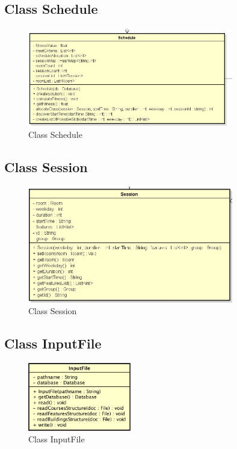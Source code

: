 \documentclass[a4paper]{article}
\begin{document}
\subsection{Class Schedule}
\begin{figure}[H]
\centering
\includegraphics[width=0.8\textwidth]{Schedule.jpg}
\caption{\label{fig:schedule}Class Schedule}
\end{figure}


\subsection{Class Session}
\begin{figure}[H]
\centering
\includegraphics[width=0.8\textwidth]{session.jpg}
\caption{\label{fig:session}Class Session}
\end{figure}


\subsection{Class InputFile}
\begin{figure}[H]
\centering
\includegraphics[width=0.4\textwidth]{InputFile.png}
\caption{\label{fig:InputFile}Class InputFile}
\end{figure}
\end{document}
